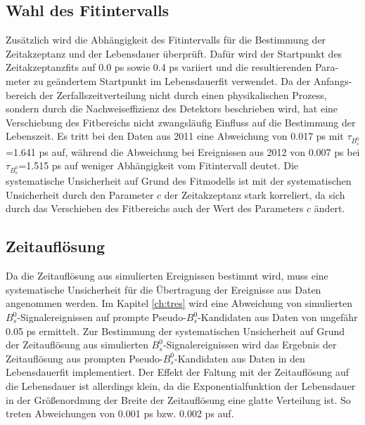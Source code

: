 \documentclass{article}
\begin{document}

\subsection{Wahl des Fitintervalls}
Zusätzlich wird die Abhängigkeit des Fitintervalls für die Bestimmung der Zeitakzeptanz und der Lebensdauer überprüft. Dafür wird der Startpunkt des Zeitakzeptanzfits auf 0.0 ps sowie 0.4 ps variiert und die resultierenden Para-meter zu geändertem Startpunkt im Lebensdauerfit verwendet. Da der Anfangs-bereich der Zerfallszeitverteilung nicht durch einen physikalischen Prozess, sondern durch die Nachweiseffizienz des Detektors beschrieben wird, hat eine Verschiebung des Fitbereichs nicht zwangsläufig Einfluss auf die Bestimmung der Lebenszeit.
Es tritt bei den Daten aus 2011 eine Abweichung von 0.017 ps mit $\tau_{B_s^0}$=1.641 ps auf, während die Abweichung bei Ereignissen aus 2012 von 0.007 ps bei $\tau_{B_s^0}$=1.515 ps auf weniger Abhängigkeit vom Fitintervall deutet. Die systematische Unsicherheit auf Grund des Fitmodells ist mit der systematischen Unsicherheit durch den Parameter $c$ der Zeitakzeptanz stark korreliert, da sich durch das Verschieben des Fitbereichs auch der Wert des Parameters $c$ ändert.

\subsection{Zeitauflösung}
Da die Zeitauflösung aus simulierten Ereignissen bestimmt wird, muss eine systematische Unsicherheit für die Übertragung der Ereignisse aus Daten angenommen werden. %
Im Kapitel \ref{ch:tres} wird eine Abweichung von simulierten $B_s^0$-Signalereignissen auf prompte Pseudo-$B_s^0$-Kandidaten aus Daten von ungefähr 0.05 ps ermittelt. Zur Bestimmung der systematischen Unsicherheit auf Grund der Zeitauflösung aus simulierten $B_s^0$-Signalereignissen wird das Ergebnis der Zeitauflösung aus prompten Pseudo-$B_s^0$-Kandidaten aus Daten in den Lebensdauerfit implementiert. Der Effekt der Faltung mit der Zeitauflösung auf die Lebensdauer ist allerdings klein, da die Exponentialfunktion der Lebensdauer in der Größenordnung der Breite der Zeitauflösung eine glatte Verteilung ist. So treten Abweichungen von 0.001 ps bzw. 0.002 ps auf.
\end{document}

